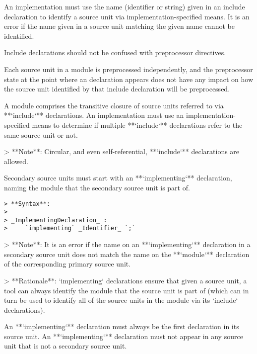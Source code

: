 An implementation must use the name (identifier or string) given in an include declaration to identify a source unit via implementation-specified means.
It is an error if the name given in a source unit matching the given name cannot be identified.

\begin{Note}
Include declarations should not be confused with preprocessor  directives.

Each source unit in a module is preprocessed independently, and the preprocessor state at the point where an  declaration appears does not have any impact on how the source unit identified by that include declaration will be preprocessed.
\end{Note}

A module comprises the transitive closure of source units referred to via **`include`** declarations.
An implementation must use an implementation-specified means to determine if multiple **`include`** declarations refer to the same source unit or not.

> **Note**: Circular, and even self-referential, **`include`** declarations are allowed.


Secondary source units must start with an **`implementing`** declaration, naming the module that the secondary source unit is part of.

\begin{verbatim}
> **Syntax**:
>
> _ImplementingDeclaration_ :
>     `implementing` _Identifier_ `;`
\end{verbatim}

> **Note**: It is an error if the name on an **`implementing`** declaration in a secondary source unit does not match the name on the **`module`** declaration of the corresponding primary source unit.

> **Rationale**: `implementing` declarations ensure that given a source unit, a tool can always identify the module that the source unit is part of (which can in turn be used to identify all of the source units in the module via its `include` declarations).

An **`implementing`** declaration must always be the first declaration in its source unit.
An **`implementing`** declaration must not appear in any source unit that is not a secondary source unit.



